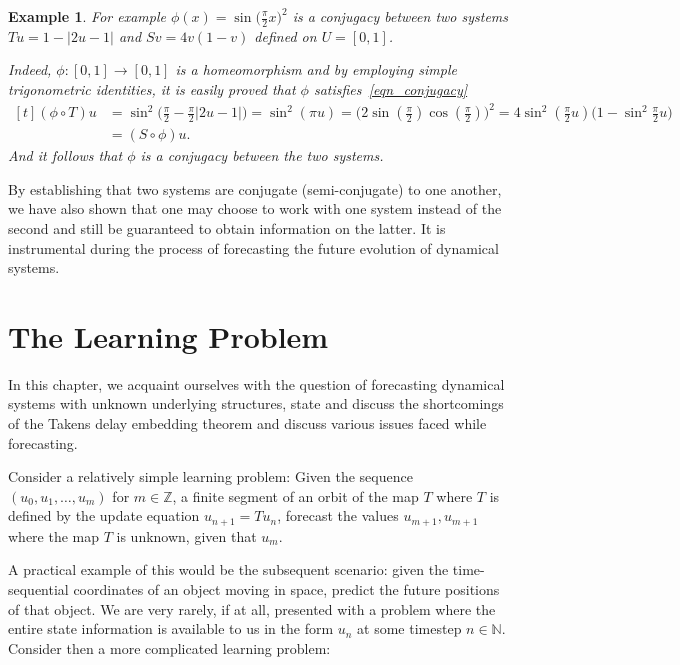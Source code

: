 \documentclass[a4paper,12pt,twoside]{report}
\newtheorem{Example}{Example}[]
\begin{document}
\begin{Example}\rm
  For example $\phi(x)=\sin\big(\frac{\pi}{2}x\big)^2$ is a conjugacy between two systems $Tu=1-|2u-1|$ and $Sv=4v(1-v)$  defined on $U=[0,1]$.  

  Indeed, $\phi:[0,1]\to[0,1]$ is a homeomorphism and by employing simple trigonometric identities, it is easily proved that $\phi$ satisfies~\ref{eqn_conjugacy}
  \[
    \begin{aligned}[t]
      (\phi\circ{T})u 
                &=\sin^{2}\Big(\frac{\pi}{2} - \frac{\pi}{2}|2u-1|\Big) = \sin^{2}(\pi{u})=\Big(2\sin(\frac{\pi}{2})\cos(\frac{\pi}{2})\Big)^{2}=4\sin^{2}(\frac{\pi}{2}u)\Big(1-\sin^{2}\frac{\pi}{2}u\Big) \\
                                    &=({S}\circ\phi)u.
    \end{aligned}
\]
And it follows that $\phi$ is a conjugacy between the two systems.
\end{Example}


By establishing that two systems are conjugate (semi-conjugate) to one another, we have also shown that one may choose to work with one system instead of the second and still be guaranteed to obtain information on the latter. It is instrumental during the process of forecasting the future evolution of dynamical systems. 


\chapter{The Learning Problem}\label{ch3}

In this chapter, we acquaint ourselves with the question of forecasting dynamical systems with unknown underlying structures, state and discuss the shortcomings of the Takens delay embedding theorem and discuss various issues faced while forecasting. 

Consider a relatively simple learning problem: 
Given the sequence $(u_0, u_1, \ldots, u_m)$ for $m\in\mathbb{Z}$, a finite segment of an orbit of the map $T$ where $T$ is defined by the update equation $u_{n+1} = Tu_n$, forecast the values $u_{m+1}, u_{m+1}$ where the map $T$ is unknown, given that $u_m$. 

A practical example of this would be the subsequent scenario: given the time-sequential coordinates of an object moving in space, predict the future positions of that object. We are very rarely, if at all, presented with a problem where the entire state information is available to us in the form $u_n$ at some timestep $n\in\mathbb{N}$. Consider then a more complicated learning problem:
\end{document}
